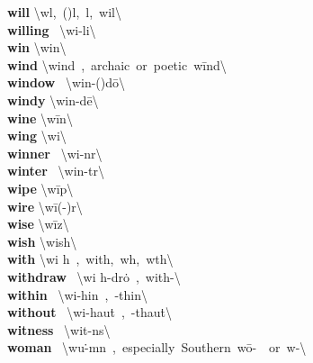 \documentclass[10pt,a4paper]{article}
\begin{document}
\begin{multicols}{2}
\textbf{ will }\quad \textbackslash w\textschwa l,\ (\textschwa )l,\ \textsuperscript{\textreve}l,\ \textprimstress wil\textbackslash \\
\textbf{ willing }\quad \ \textbackslash \textprimstress wi-li\engma \textbackslash \\
\textbf{ win }\quad \textbackslash \textprimstress win\textbackslash \\
\textbf{ wind }\quad \textbackslash \textprimstress wind\ ,\ archaic\ or\ poetic\ \textprimstress w\={i}nd\textbackslash \\
\textbf{ window }\quad \ \textbackslash \textprimstress win-(\textsecstress )d\={o}\textbackslash \\
\textbf{ windy }\quad \textbackslash \textprimstress win-d\={e}\textbackslash \\
\textbf{ wine }\quad \textbackslash \textprimstress w\={i}n\textbackslash \\
\textbf{ wing }\quad \textbackslash \textprimstress wi\engma \textbackslash \\
\textbf{ winner }\quad \ \textbackslash \textprimstress wi-n\textschwa r\textbackslash \\
\textbf{ winter }\quad \ \textbackslash \textprimstress win-t\textschwa r\textbackslash \\
\textbf{ wipe }\quad \textbackslash \textprimstress w\={i}p\textbackslash \\
\textbf{ wire }\quad \textbackslash \textprimstress w\={i}(-\textschwa )r\textbackslash \\
\textbf{ wise }\quad \textbackslash \textprimstress w\={i}z\textbackslash \\
\textbf{ wish }\quad \textbackslash \textprimstress wish\textbackslash \\
\textbf{ with }\quad \textbackslash \textprimstress wi h\ ,\ \textprimstress with,\ w\textschwa  h,\ w\textschwa th\textbackslash \\
\textbf{ withdraw }\quad \ \textbackslash wi h-\textprimstress dr\.{o}\ ,\ with-\textbackslash \\
\textbf{ within }\quad \ \textbackslash wi-\textprimstress  hin\ ,\ -\textprimstress thin\textbackslash \\
\textbf{ without }\quad \ \textbackslash wi-\textprimstress  hau\. t\ ,\ -\textprimstress thau\. t\textbackslash \\
\textbf{ witness }\quad \ \textbackslash \textprimstress wit-n\textschwa s\textbackslash \\
\textbf{ woman }\quad \ \textbackslash \textprimstress wu\. -m\textschwa n\ ,\ especially\ Southern\ \textprimstress w\={o}-\ \ or\ \textprimstress w\textschwa -\textbackslash \\

\end{multicols}
\end{document}

